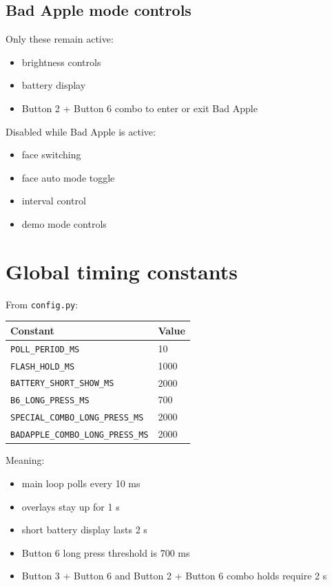 \documentclass[11pt]{article}
\begin{document}
\subsection{Bad Apple mode controls}
Only these remain active:
\begin{itemize}
  \item brightness controls
  \item battery display
  \item Button 2 + Button 6 combo to enter or exit Bad Apple
\end{itemize}

Disabled while Bad Apple is active:
\begin{itemize}
  \item face switching
  \item face auto mode toggle
  \item interval control
  \item demo mode controls
\end{itemize}

\section{Global timing constants}
From \texttt{config.py}:
\begin{center}
\begin{tabular}{ll}
\toprule
Constant & Value \\
\midrule
\texttt{POLL\_PERIOD\_MS} & 10 \\
\texttt{FLASH\_HOLD\_MS} & 1000 \\
\texttt{BATTERY\_SHORT\_SHOW\_MS} & 2000 \\
\texttt{B6\_LONG\_PRESS\_MS} & 700 \\
\texttt{SPECIAL\_COMBO\_LONG\_PRESS\_MS} & 2000 \\
\texttt{BADAPPLE\_COMBO\_LONG\_PRESS\_MS} & 2000 \\
\bottomrule
\end{tabular}
\end{center}

Meaning:
\begin{itemize}
  \item main loop polls every 10 ms
  \item overlays stay up for 1 s
  \item short battery display lasts 2 s
  \item Button 6 long press threshold is 700 ms
  \item Button 3 + Button 6 and Button 2 + Button 6 combo holds require 2 s
\end{itemize}
\end{document}
